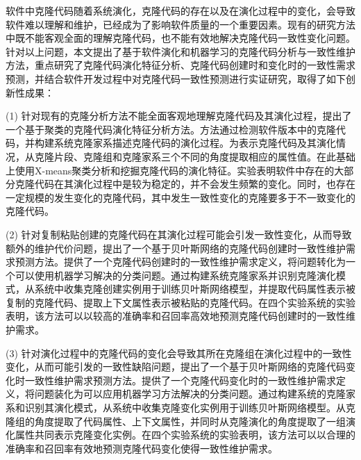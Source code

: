 



软件中克隆代码随着系统演化，克隆代码的存在以及在演化过程中的变化，会导致软件难以理解和维护，已经成为了影响软件质量的一个重要因素。现有的研究方法中既不能客观全面的理解克隆代码，也不能有效地解决克隆代码一致性变化问题。针对以上问题，本文提出了基于软件演化和机器学习的克隆代码分析与一致性维护方法，重点研究了克隆代码演化特征分析、克隆代码创建时和变化时的一致性需求预测，并结合软件开发过程中对克隆代码一致性预测进行实证研究，取得了如下创新性成果：

(1) 针对现有的克隆分析方法不能全面客观地理解克隆代码及其演化过程，提出了一个基于聚类的克隆代码演化特征分析方法。方法通过检测软件版本中的克隆代码，并构建系统克隆家系描述克隆代码的演化过程。为表示克隆代码及其演化情况，从克隆片段、克隆组和克隆家系三个不同的角度提取相应的属性值。在此基础上使用X-means聚类分析和挖掘克隆代码的演化特征。实验表明软件中存在的大部分克隆代码在其演化过程中是较为稳定的，并不会发生频繁的变化。同时，也存在一定规模的发生变化的克隆代码，其中发生一致性变化的克隆要多于不一致变化的克隆代码。

(2) 针对复制粘贴创建的克隆代码在其演化过程可能会引发一致性变化，从而导致额外的维护代价问题，提出了一个基于贝叶斯网络的克隆代码创建时一致性维护需求预测方法。提供了一个克隆代码创建时的一致性维护需求定义，将问题转化为一个可以使用机器学习解决的分类问题。通过构建系统克隆家系并识别克隆演化模式，从系统中收集克隆创建实例用于训练贝叶斯网络模型，并提取代码属性表示被复制的克隆代码、提取上下文属性表示被粘贴的克隆代码。在四个实验系统的实验表明，该方法可以以较高的准确率和召回率高效地预测克隆代码创建时的一致性维护需求。

(3) 针对演化过程中的克隆代码的变化会导致其所在克隆组在演化过程中的一致性变化，从而可能引发的一致性缺陷问题，提出了一个基于贝叶斯网络的克隆代码变化时一致性维护需求预测方法。提供了一个克隆代码变化时的一致性维护需求定义，将问题装化为可以应用机器学习方法解决的分类问题。通过构建系统的克隆家系和识别其演化模式，从系统中收集克隆变化实例用于训练贝叶斯网络模型。从克隆组的角度提取了代码属性、上下文属性，并同时从克隆演化的角度提取了一组演化属性共同表示克隆变化实例。在四个实验系统的实验表明，该方法可以以合理的准确率和召回率有效地预测克隆代码变化使得一致性维护需求。

